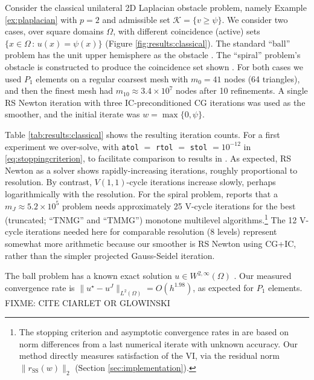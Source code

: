 \documentclass[review,hidelinks,onefignum,onetabnum,final]{siamart220329}  %
\newcommand{\rSS}{r_{\text{SS}}}
\begin{document}
\begin{example} \label{ex:results:classical}
Consider the classical unilateral 2D Laplacian obstacle problem, namely Example \ref{ex:plaplacian} with $p=2$ and admissible set $\mathcal{K} = \{v \ge \psi\}$.  We consider two cases, over square domains $\Omega$, with different coincidence (active) sets $\{x\in\Omega \,:\, u(x)=\psi(x)\}$ (Figure \ref{fig:results:classical}).  The standard ``ball'' problem has the unit upper hemisphere as the obstacle \cite[Chapter 12]{Bueler2021}.  The ``spiral'' problem's obstacle is constructed to produce the coincidence set shown \cite[problem 7.1.1]{GraeserKornhuber2009}.  For both cases we used $P_1$ elements on a regular coarsest mesh with $m_0=41$ nodes (64 triangles), and then the finest mesh had $m_{10} \approx 3.4 \times 10^7$ nodes after 10 refinements.  A single RS Newton iteration with three IC-preconditioned CG iterations was used as the smoother, and the initial iterate was $w=\max\{0,\psi\}$.

Table \ref{tab:results:classical} shows the resulting iteration counts.  For a first experiment we over-solve, with \texttt{atol} $=$ \texttt{rtol} $=$ \texttt{stol} $= 10^{-12}$ in \eqref{eq:stoppingcriterion}, to facilitate comparison to results in \cite[section 7]{GraeserKornhuber2009}.  As expected, RS Newton as a solver shows rapidly-increasing iterations, roughly proportional to resolution.  By contrast, $V(1,1)$-cycle iterations increase slowly, perhaps logarithmically with the resolution.  For the spiral problem, \cite[Figure 7.11]{GraeserKornhuber2009} reports that a $m_J \approx 5.2 \times 10^5$ problem needs approximately 25 V-cycle iterations for the best (truncated;  ``TNMG'' and ``TMMG'') monotone multilevel algorithms.\footnote{The stopping criterion and asymptotic convergence rates in \cite{GraeserKornhuber2009} are based on norm differences from a last numerical iterate with unknown accuracy.  Our method directly measures satisfaction of the VI, via the residual norm $\|\rSS(w)\|_2$ (Section \ref{sec:implementation}).}  The 12 V-cycle iterations needed here for comparable resolution (8 levels) represent somewhat more arithmetic because our smoother is RS Newton using CG+IC, rather than the simpler projected Gauss-Seidel iteration.

The ball problem has a known exact solution $u\in W^{2,\infty}(\Omega)$ \cite{Bueler2021,Tai2003}.  Our measured convergence rate is $\|u^\star-u^J\|_{L^2(\Omega)}=O(h^{1.98})$, as expected for $P_1$ elements.  FIXME: CITE CIARLET OR GLOWINSKI


\end{example}
\end{document}
